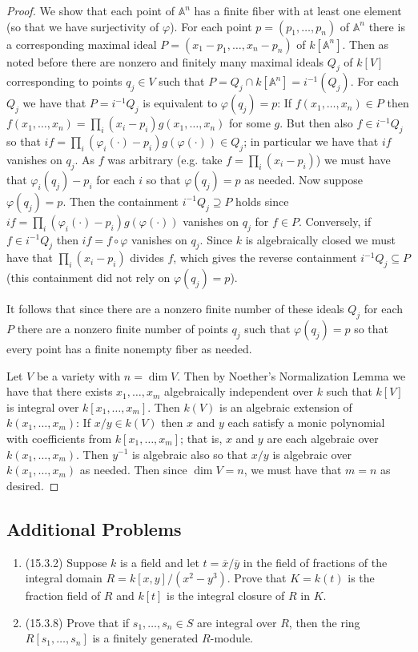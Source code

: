 \documentclass[11pt]{article}
\begin{document}
\begin{enumerate}
\begin{proof}
        We show that each point of $\mathbb{A}^n$ has a finite fiber with at least one element (so that we have surjectivity of $\varphi$). For each point $p = (p_1,\dots,p_n)$ of $\mathbb{A}^n$ there is a corresponding maximal ideal $P = (x_1-p_1,\dots,x_n-p_n)$ of $k[\mathbb{A}^n]$. Then as noted before there are nonzero and finitely many maximal ideals $Q_j$ of $k[V]$ corresponding to points $q_j\in V$ such that $P = Q_j\cap k[\mathbb{A}^n] = i^{-1}(Q_j)$. For each $Q_j$ we have that $P = i^{-1}Q_j$ is equivalent to $\varphi(q_j)=p$: If $f(x_1,\dots,x_n)\in P$ then $f(x_1,\dots,x_n) = \prod_i(x_i-p_i)g(x_1,\dots,x_n)$ for some $g$. But then also $f\in i^{-1}Q_j$ so that $if = \prod_i(\varphi_i(\cdot)-p_i)g(\varphi(\cdot))\in Q_j$; in particular we have that $if$ vanishes on $q_j$. As $f$ was arbitrary (e.g. take $f = \prod_i(x_i-p_i)$) we must have that $\varphi_i(q_j)-p_i$ for each $i$ so that $\varphi(q_j) = p$ as needed. Now suppose $\varphi(q_j) = p$. Then the containment $i^{-1}Q_j\supseteq P$ holds since $if=\prod_i(\varphi_i(\cdot)-p_i)g(\varphi(\cdot))$ vanishes on $q_j$ for $f\in P$. Conversely, if $f\in i^{-1}Q_j$ then $if=f\circ \varphi$ vanishes on $q_j$. Since $k$ is algebraically closed we must have that $\prod_i(x_i-p_i)$ divides $f$, which gives the reverse containment $i^{-1}Q_j\subseteq P$ (this containment did not rely on $\varphi(q_j) =p$).

        It follows that since there are a nonzero finite number of these ideals $Q_j$ for each $P$ there are a nonzero finite number of points $q_j$ such that $\varphi(q_j) = p$ so that every point has a finite nonempty fiber as needed.

        Let $V$ be a variety with $n = \dim V$. Then by Noether's Normalization Lemma we have that there exists $x_1,\dots,x_m$ algebraically independent over $k$ such that $k[V]$ is integral over $k[x_1,\dots,x_m]$. Then $k(V)$ is an algebraic extension of $k(x_1,\dots,x_m)$: If $x/y\in k(V)$ then $x$ and $y$ each satisfy a monic polynomial with coefficients from $k[x_1,\dots,x_m]$; that is, $x$ and $y$ are each algebraic over $k(x_1,\dots,x_m)$. Then $y^{-1}$ is algebraic also so that $x/y$ is algebraic over $k(x_1,\dots,x_m)$ as needed. Then since $\dim V =n$, we must have that $m= n$ as desired.
    \end{proof}
\end{enumerate}
\subsection*{Additional Problems}
\begin{enumerate}
    \item (15.3.2) Suppose $k$ is a field and let $t = \overline{x}/\overline{y}$ in the field of fractions of the integral domain $R = k[x,y]/(x^2-y^3)$. Prove that $K = k(t)$ is the fraction field of $R$ and $k[t]$ is the integral closure of $R$ in $K$.
    \item (15.3.8) Prove that if $s_1,\dots,s_n\in S$ are integral over $R$, then the ring $R[s_1,\dots,s_n]$ is a finitely generated $R$-module.
\end{enumerate}
\end{document}
